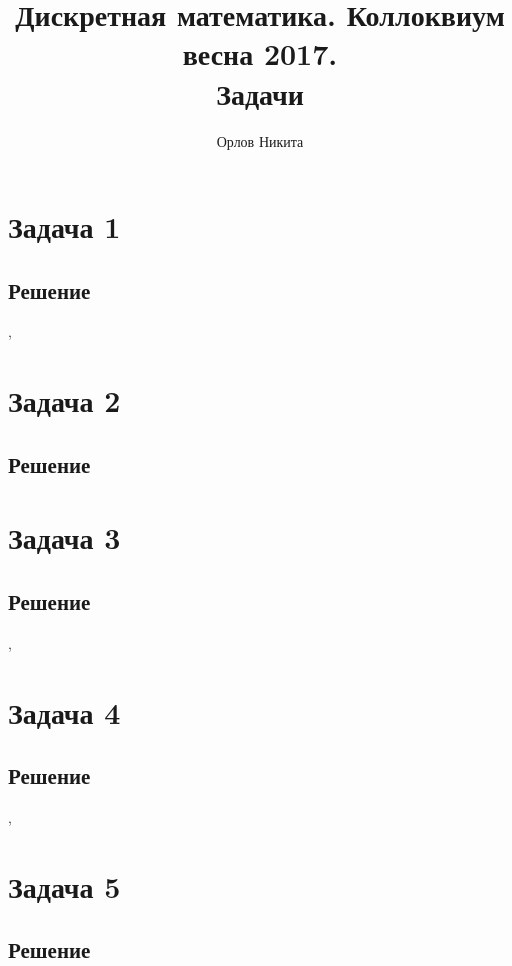 \documentclass[a4paper,12pt]{article}
\begin{document}
	\title{Дискретная математика. Коллоквиум весна 2017. \\ Задачи}
	\author{Орлов Никита}
	\maketitle
	
	\section*{Задача 1}
	\subsection*{Решение}
	
	\sep	
	
	
	\section*{Задача 2}
	
	\subsection*{Решение}
	
	\section*{Задача 3}
	
	
	\subsection*{Решение}
	
	
	\sep	
	
	\section*{Задача 4}

	\subsection*{Решение}


	\sep	
	
	\section*{Задача 5}
	
	\subsection*{Решение}
	
\end{document}
